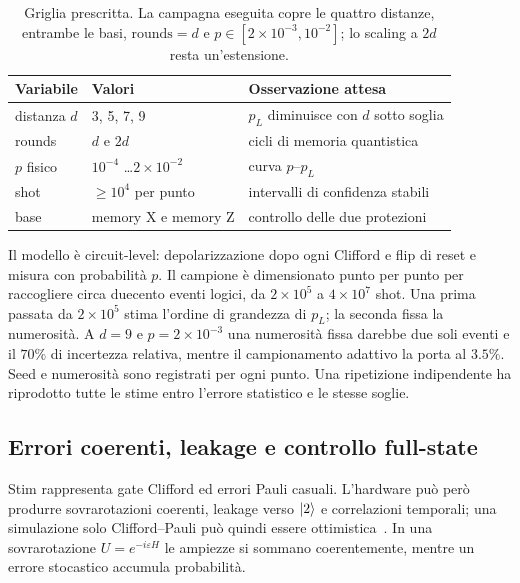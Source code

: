 \begin{onehalfspace}
\begin{table}[H]
\centering
\begin{tabularx}{\textwidth}{llX}
\toprule
\textbf{Variabile} & \textbf{Valori} & \textbf{Osservazione attesa} \\
\midrule
distanza $d$ & 3, 5, 7, 9 & $p_L$ diminuisce con $d$ sotto soglia \\
\addlinespace[0.3em]
rounds & $d$ e $2d$ & cicli di memoria quantistica \\
\addlinespace[0.3em]
$p$ fisico & $10^{-4}$ \dots $2\times10^{-2}$ & curva $p$--$p_L$ \\
\addlinespace[0.3em]
shot & $\geq10^4$ per punto & intervalli di confidenza stabili \\
\addlinespace[0.3em]
base & memory X e memory Z & controllo delle due protezioni \\
\bottomrule
\end{tabularx}
\caption[Disegno sperimentale surface code]{Griglia prescritta. La
campagna eseguita copre le quattro distanze, entrambe le basi,
$\mathrm{rounds}=d$ e $p\in[2\times10^{-3},10^{-2}]$; lo scaling a
$2d$ resta un'estensione.}\label{tab:surface_esperimento}

\end{table}

Il modello è circuit-level: depolarizzazione dopo ogni Clifford e flip di
reset e misura con probabilità $p$. Il campione è dimensionato punto per
punto per raccogliere circa duecento eventi logici, da $2\times10^5$ a
$4\times10^7$ shot. Una prima passata da $2\times10^5$ stima l'ordine di
grandezza di $p_L$; la seconda fissa la numerosità. A $d=9$ e
$p=2\times10^{-3}$ una numerosità fissa darebbe due soli eventi e il
$70\%$ di incertezza relativa, mentre il campionamento adattivo la porta
al $3.5\%$. Seed e numerosità sono registrati per ogni punto. Una
ripetizione indipendente ha riprodotto tutte le stime entro l'errore
statistico e le stesse soglie.

\subsection{Errori coerenti, leakage e controllo full-state}
\label{app:surface_non_pauli}

Stim rappresenta gate Clifford ed errori Pauli casuali. L'hardware può
però produrre sovrarotazioni coerenti, leakage verso $\ket{2}$ e
correlazioni temporali; una simulazione solo Clifford--Pauli può quindi
essere ottimistica~\cite{plaquette2026}. In una sovrarotazione
$U=e^{-i\varepsilon H}$ le ampiezze si sommano coerentemente, mentre un
errore stocastico accumula probabilità.


\end{onehalfspace}
